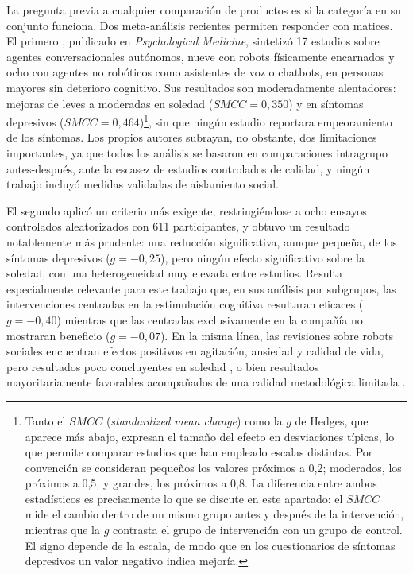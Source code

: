 La pregunta previa a cualquier comparación de productos es si la categoría en su conjunto funciona. Dos
meta-análisis recientes permiten responder con matices. El primero \citep{Satake2026}, publicado en
\textit{Psychological Medicine}, sintetizó 17 estudios sobre agentes conversacionales autónomos, nueve con
robots físicamente encarnados y ocho con agentes no robóticos como asistentes de voz o chatbots, en personas
mayores sin deterioro cognitivo. Sus resultados son moderadamente alentadores: mejoras de leves a moderadas en
soledad ($SMCC = 0{,}350$) y en síntomas depresivos ($SMCC = 0{,}464$)\footnote{Tanto el $SMCC$
(\textit{standardized mean change}) como la $g$ de Hedges, que aparece más abajo, expresan el tamaño del
efecto en desviaciones típicas, lo que permite comparar estudios que han empleado escalas distintas. Por
convención se consideran pequeños los valores próximos a 0,2; moderados, los próximos a 0,5, y grandes, los
próximos a 0,8. La diferencia entre ambos estadísticos es precisamente lo que se discute en este apartado:
el $SMCC$ mide el cambio dentro de un mismo grupo antes y después de la intervención, mientras que la $g$
contrasta el grupo de intervención con un grupo de control. El signo depende de la escala, de modo que en
los cuestionarios de síntomas depresivos un valor negativo indica mejoría.}, sin que ningún estudio reportara
empeoramiento de los síntomas. Los propios autores subrayan, no obstante, dos limitaciones importantes, ya que
todos los análisis se basaron en comparaciones intragrupo antes-después, ante la escasez de estudios
controlados de calidad, y ningún trabajo incluyó medidas validadas de aislamiento social.

El segundo \citep{Gou2026} aplicó un criterio más exigente, restringiéndose a ocho ensayos controlados
aleatorizados con 611 participantes, y obtuvo un resultado notablemente más prudente: una reducción
significativa, aunque pequeña, de los síntomas depresivos ($g = -0{,}25$), pero ningún efecto significativo
sobre la soledad, con una heterogeneidad muy elevada entre estudios. Resulta especialmente relevante para este
trabajo que, en sus análisis por subgrupos, las intervenciones centradas en la estimulación cognitiva
resultaran eficaces ($g = -0{,}40$) mientras que las centradas exclusivamente en la compañía no mostraran
beneficio ($g = -0{,}07$). En la misma línea, las revisiones sobre robots sociales encuentran efectos
positivos en agitación, ansiedad y calidad de vida, pero resultados poco concluyentes en soledad
\citep{Pu2019}, o bien resultados mayoritariamente favorables acompañados de una calidad metodológica
limitada \citep{Gasteiger2021}.

